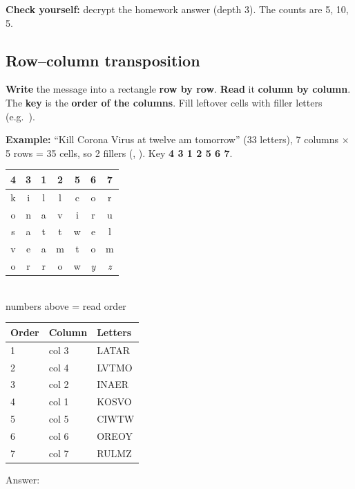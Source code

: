 \textbf{Check yourself:} decrypt the homework answer  (depth 3). The counts are 5, 10, 5.

\subsection{Row--column transposition}
\begin{keybox}[title=A more complex scheme]
\textbf{Write} the message into a rectangle \textbf{row by row}. \textbf{Read} it \textbf{column by column}. The \textbf{key} is the \textbf{order of the columns}. Fill leftover cells with filler letters (e.g.\ ).
\end{keybox}

\textbf{Example:} ``Kill Corona Virus at twelve am tomorrow'' (33 letters), 7 columns $\times$ 5 rows = 35 cells, so 2 fillers (, ). Key \textbf{4 3 1 2 5 6 7}.
\begin{center}\small
\begin{minipage}[c]{0.4\textwidth}\centering
\begin{tabular}{|*{7}{c|}}
\multicolumn{1}{c}{4}&\multicolumn{1}{c}{3}&\multicolumn{1}{c}{\textbf{1}}&\multicolumn{1}{c}{2}&\multicolumn{1}{c}{5}&\multicolumn{1}{c}{6}&\multicolumn{1}{c}{7}\\
\hline
k&i&\cellcolor{warn!18}l&l&c&o&r\\ \hline
o&n&\cellcolor{warn!18}a&v&i&r&u\\ \hline
s&a&\cellcolor{warn!18}t&t&w&e&l\\ \hline
v&e&\cellcolor{warn!18}a&m&t&o&m\\ \hline
o&r&\cellcolor{warn!18}r&o&w&\textit{y}&\textit{z}\\ \hline
\end{tabular}\\[2pt]
{\footnotesize numbers above = read order}
\end{minipage}
\begin{minipage}[c]{0.5\textwidth}
\begin{tabular}{@{}lll@{}}
\toprule
Order & Column & Letters\\
\midrule
1 & col 3 & LATAR\\
2 & col 4 & LVTMO\\
3 & col 2 & INAER\\
4 & col 1 & KOSVO\\
5 & col 5 & CIWTW\\
6 & col 6 & OREOY\\
7 & col 7 & RULMZ\\
\bottomrule
\end{tabular}
\end{minipage}
\end{center}
Answer: \textbf{}

